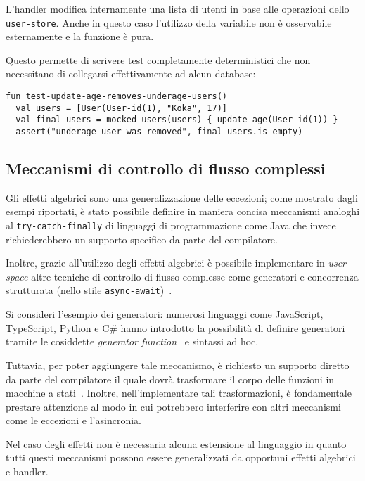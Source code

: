 L'handler modifica internamente una lista di utenti in base alle operazioni dello \lstinline{user-store}. Anche in questo caso l'utilizzo della variabile non è osservabile esternamente e la funzione è pura.

Questo permette di scrivere test completamente deterministici che non necessitano di collegarsi effettivamente ad alcun database:
\begin{lstlisting}[language=koka]
fun test-update-age-removes-underage-users()
  val users = [User(User-id(1), "Koka", 17)]
  val final-users = mocked-users(users) { update-age(User-id(1)) }
  assert("underage user was removed", final-users.is-empty)
\end{lstlisting}

\subsection{Meccanismi di controllo di flusso complessi}
Gli effetti algebrici sono una generalizzazione delle eccezioni; come mostrato dagli esempi riportati, è stato possibile definire in maniera concisa meccanismi analoghi al \lstinline{try-catch-finally} di linguaggi di programmazione come Java che invece richiederebbero un supporto specifico da parte del compilatore.

Inoltre, grazie all'utilizzo degli effetti algebrici è possibile implementare in \emph{user space} altre tecniche di controllo di flusso complesse come generatori e concorrenza strutturata (nello stile \lstinline{async-await})~\cite{cit:structured-asynchrony-with-algebraic-effects}.

Si consideri l'esempio dei generatori: numerosi linguaggi come JavaScript, TypeScript, Python e C\# hanno introdotto la possibilità di definire generatori tramite le cosiddette \emph{generator function}~\cite{cit:yield-statement-c-sharp,cit:yield-statement-javascript,cit:yield-statement-python} e sintassi ad hoc.

Tuttavia, per poter aggiungere tale meccanismo, è richiesto un supporto diretto da parte del compilatore il quale dovrà trasformare il corpo delle funzioni in macchine a stati~\cite{cit:iterators-technical-implementation}. Inoltre, nell'implementare tali trasformazioni, è fondamentale prestare attenzione al modo in cui potrebbero interferire con altri meccanismi come le eccezioni e l'asincronia.

Nel caso degli effetti non è necessaria alcuna estensione al linguaggio in quanto tutti questi meccanismi possono essere generalizzati da opportuni effetti algebrici e handler.

